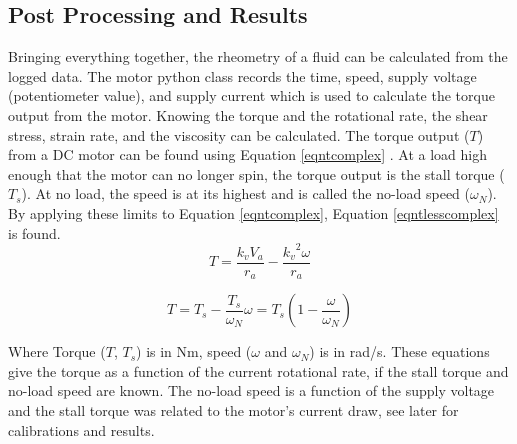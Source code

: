 \documentclass[twoside,a4]{report}
\begin{document}
	\subsection*{Post Processing and Results}
	Bringing everything together, the rheometry of a fluid can be calculated from the logged data. The motor python class records the time, speed, supply voltage (potentiometer value), and supply current which is used to calculate the torque output from the motor. Knowing the torque and the rotational rate, the shear stress, strain rate, and the viscosity can be calculated. The torque output (\(T\)) from a DC motor can be found using Equation \ref{eqntcomplex} \cite{backdcmotor}. At a load high enough that the motor can no longer spin, the torque output is the stall torque (\(T_s\)). At no load, the speed is at its highest and is called the no-load speed (\(\omega_N\)). By applying these limits to Equation \ref{eqntcomplex}, Equation \ref{eqntlesscomplex} is found.
	\begin{equation}
		T = \frac{k_v V_a}{r_a} - \frac{{{k_v}^2} \omega}{r_a}
		\label{eqntcomplex}
	\end{equation}
	
	
	\begin{equation}
		T = T_s - \frac{T_s}{\omega_N} \omega = T_s \left(1 - \frac{\omega}{\omega_N}\right)
		\label{eqntlesscomplex}
	\end{equation}
	
	
	\noindent
	Where Torque (\(T\), \(T_s\)) is in Nm, speed (\(\omega\) and \(\omega_N\)) is in rad/s. These equations give the torque as a function of the current rotational rate, if the stall torque and no-load speed are known. The no-load speed is a function of the supply voltage and the stall torque was related to the motor's current draw, see later for calibrations and results. \newline
	
	
\end{document}
